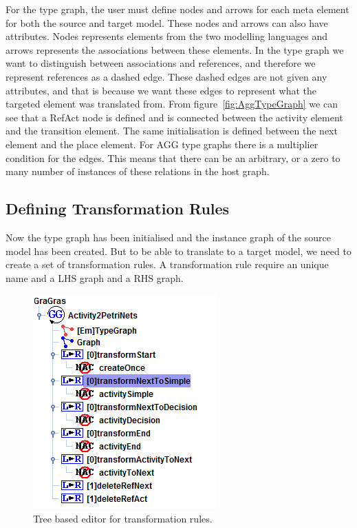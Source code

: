 \documentclass[pdftex,11pt,a4paper]{article}
\begin{document}
\indent For the type graph, the user must define nodes and arrows for each meta
element for both the source and target model. These nodes and arrows can also
have attributes. Nodes represents elements from the two modelling languages and
arrows represents the associations between these elements. In the type graph we
want to distinguish between associations and references, and therefore we
represent references as a dashed edge. These dashed edges are not given any
attributes, and that is because we want these edges to represent what the
targeted element was translated from. From figure~\ref{fig:AggTypeGraph} we can
see that a RefAct node is defined and is connected between the activity
element and the transition element. The same initialisation is defined between
the next element and the place element. For AGG type graphs there is a
multiplier condition for the edges. This means that there can be an arbitrary,
or a zero to many number of instances of these relations in the host graph.

\subsection{Defining Transformation Rules}
Now the type graph has been initialised and the instance graph of the
source model has been created. But to be able to translate to a target model,
we need to create a set of transformation rules. A transformation rule
require an unique name and a LHS graph and a RHS graph. 

\begin{figure}[H]
	\centering
	\includegraphics[scale=0.7]{figures/AGGTreeBasedEditor.png}
	\caption{Tree based editor for transformation rules.}
	\label{fig:AGGTreeBasedEditor}
\end{figure}
\end{document}
